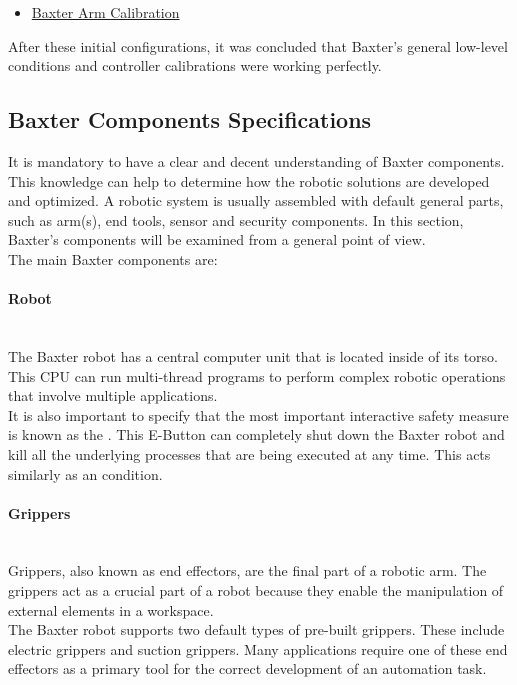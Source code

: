\documentclass[11pt]{report} %
\newcommand{\subsubsubsection}[1]{\paragraph{#1}\mbox{}\\}
\begin{document}
\begin{itemize}
    \color{blue}
    \item \href{https://sdk.rethinkrobotics.com/wiki/Arm_Calibration}{Baxter Arm Calibration}
\end{itemize}

After these initial configurations, it was concluded that Baxter's general low-level conditions and controller calibrations were working perfectly.\\


\subsection{Baxter Components Specifications}

It is mandatory to have a clear and decent understanding of Baxter components. This knowledge can help to determine how the robotic solutions are developed and optimized. A robotic system is usually assembled with default general parts, such as arm(s), end tools, sensor and security components. In this section, Baxter's components will be examined from a general point of view.\\

The main Baxter components are:

\subsubsubsection{Robot}

The Baxter robot has a central computer unit that is located inside of its torso. This
CPU can run multi-thread programs to perform complex robotic operations that involve multiple applications.\\

It is also important to specify that the most important interactive safety measure is known as the . This E-Button can completely shut down the Baxter robot and kill all the underlying processes that are being executed at any time. This acts similarly as an  condition.\\


\subsubsubsection{Grippers}

Grippers, also known as end effectors, are the final part of a robotic arm. The grippers act as a crucial part of a robot because they enable the manipulation of external elements in a workspace.\\

The Baxter robot supports two default types of pre-built grippers. These include electric grippers and suction grippers. Many applications require one of these end effectors as a primary tool for the correct development of an automation task.\\
\end{document}
